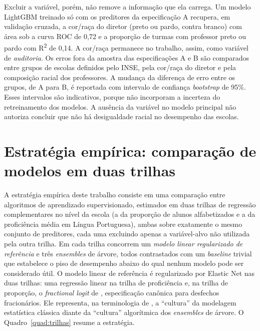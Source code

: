 Excluir a variável, porém, não remove a informação que ela carrega. Um
modelo LightGBM treinado só com os preditores da especificação A recupera,
em validação cruzada, a cor/raça do diretor (preto ou pardo, contra branco)
com área sob a curva ROC de 0,72 e a proporção de turmas com professor
preto ou pardo com R\textsuperscript{2} de 0,14. A cor/raça permanece no
trabalho, assim, como variável de \emph{auditoria}. Os erros fora da
amostra das especificações A e B são comparados entre grupos de escolas
definidos pelo INSE, pela cor/raça do diretor e pela composição racial dos
professores. A mudança da diferença de erro entre os grupos, de A para B,
é reportada com intervalo de confiança \textit{bootstrap} de 95\%. Esses
intervalos são indicativos, porque não incorporam a incerteza do
retreinamento dos modelos. A ausência da variável no modelo principal não
autoriza concluir que não há desigualdade racial no desempenho das escolas.

\section{Estratégia empírica: comparação de modelos em duas trilhas}
\label{sec:estrategia-empirica}

A estratégia empírica deste trabalho consiste em uma comparação entre
algoritmos de aprendizado supervisionado, estimados em duas trilhas de
regressão complementares no nível da escola (a da proporção de alunos
alfabetizados e a da proficiência média em Língua Portuguesa), ambas
sobre exatamente o mesmo conjunto de preditores, cada uma excluindo apenas
a variável-alvo não utilizada pela outra trilha. Em cada trilha concorrem
um \emph{modelo linear regularizado de referência} e três
\textit{ensembles} de árvore, todos contrastados com um \textit{baseline}
trivial que estabelece o piso de desempenho abaixo do qual nenhum modelo
pode ser considerado útil. O modelo linear de referência é regularizado por
Elastic Net nas duas trilhas: uma regressão linear na trilha de proficiência
e, na trilha de proporção, o \textit{fractional logit} de
, especificação canônica para desfechos
fracionários. Ele representa, na terminologia de
, a ``cultura'' da modelagem estatística clássica
diante da ``cultura'' algorítmica dos \textit{ensembles} de árvore.
O Quadro~\ref{quad:trilhas} resume a estratégia.

